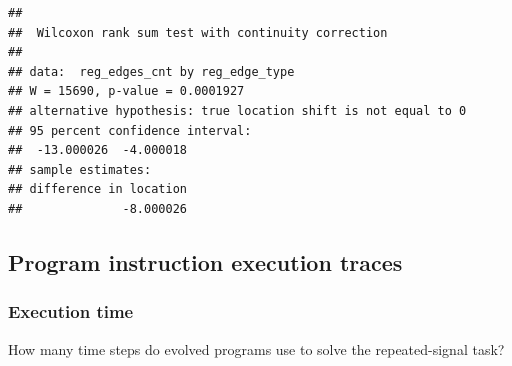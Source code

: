 \documentclass[
]{book}
\newenvironment{Shaded}{\begin{snugshade}}{\end{snugshade}}
\newcommand{\CharTok}[1]{\textcolor[rgb]{0.31,0.60,0.02}{#1}}
\newcommand{\CommentTok}[1]{\textcolor[rgb]{0.56,0.35,0.01}{\textit{#1}}}
\newcommand{\DataTypeTok}[1]{\textcolor[rgb]{0.13,0.29,0.53}{#1}}
\newcommand{\FloatTok}[1]{\textcolor[rgb]{0.00,0.00,0.81}{#1}}
\newcommand{\KeywordTok}[1]{\textcolor[rgb]{0.13,0.29,0.53}{\textbf{#1}}}
\newcommand{\NormalTok}[1]{#1}
\newcommand{\OperatorTok}[1]{\textcolor[rgb]{0.81,0.36,0.00}{\textbf{#1}}}
\newcommand{\StringTok}[1]{\textcolor[rgb]{0.31,0.60,0.02}{#1}}
\begin{document}
\begin{verbatim}
## 
##  Wilcoxon rank sum test with continuity correction
## 
## data:  reg_edges_cnt by reg_edge_type
## W = 15690, p-value = 0.0001927
## alternative hypothesis: true location shift is not equal to 0
## 95 percent confidence interval:
##  -13.000026  -4.000018
## sample estimates:
## difference in location 
##              -8.000026
\end{verbatim}

\hypertarget{program-instruction-execution-traces-1}{%
\subsection{Program instruction execution traces}\label{program-instruction-execution-traces-1}}

\hypertarget{execution-time-1}{%
\subsubsection{Execution time}\label{execution-time-1}}

How many time steps do evolved programs use to solve the repeated-signal task?

\begin{Shaded}
\end{Shaded}
\end{document}
